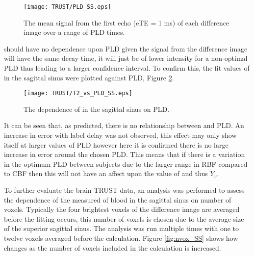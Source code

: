 \begin{figure}[H]
	\centering
	\texttt{[image: TRUST/PLD\_SS.eps]}
	\caption{The mean signal from the first echo (\ac{eTE} = 1 ms) of each difference image over a range of \ac{PLD} times.}
	\label{fig:Sig_vs_PLD_SS}	
\end{figure}

\ttwo should have no dependence upon \ac{PLD} given the signal from the difference image will have the same decay time, it will just be of lower intensity for a non-optimal \ac{PLD} thus leading to a larger confidence interval. To confirm this, the fit values of \ttwo in the sagittal sinus were plotted against \ac{PLD}, Figure \ref{fig:SS_T2vsPLD}.

\begin{figure}[H]
	\centering
	\texttt{[image: TRUST/T2\_vs\_PLD\_SS.eps]}
	\caption{The dependence of \ttwo in the sagittal sinus on \ac{PLD}.}
	\label{fig:SS_T2vsPLD}	
\end{figure}


It can be seen that, as predicted, there is no relationship between \ttwo and \ac{PLD}. An increase in error with label delay was not observed, this effect may only show itself at larger values of \ac{PLD} however here it is confirmed there is no large increase in error around the chosen \ac{PLD}. This means that if there is a variation in the optimum \ac{PLD} between subjects due to the larger range in \ac{RBF} compared to \ac{CBF} then this will not have an affect upon the value of \ttwo and thus $Y_v$.

To further evaluate the brain \ac{TRUST} data, an analysis was performed to assess the dependence of the measured \ttwo of blood in the sagittal sinus on number of voxels. Typically the four brightest voxels of the difference image are averaged before the fitting occurs, this number of voxels is chosen due to the average size of the superior sagittal sinus. The analysis was run multiple times with one to twelve voxels averaged before the calculation. Figure \ref{fig:nvox_SS} shows how \ttwo changes as the number of voxels included in the calculation is increased. %

